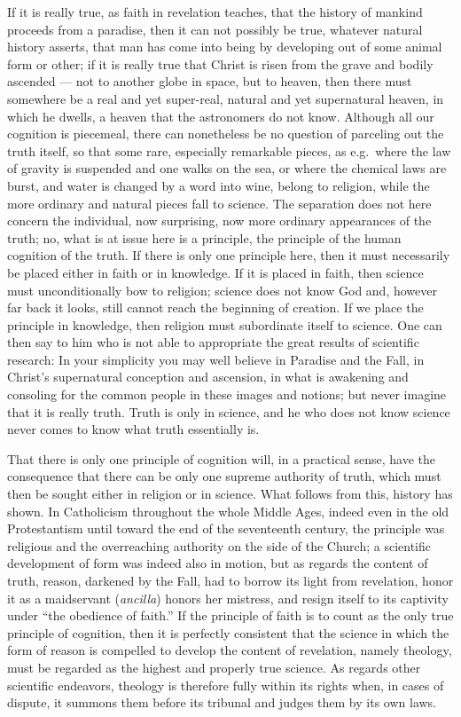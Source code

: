 \documentclass[12pt,a4paper]{article}
\newcommand{\opage}[1]{\marginnote{\footnotesize\textit{[#1]}}}
\begin{document}
If it is really true, as faith in revelation teaches, that
the history of mankind proceeds from a paradise, then it can
not possibly be true, whatever natural history asserts, that man
has come into being by developing out of some animal form or other;
if it is really true that Christ is risen from the grave and bodily
ascended --- not to another globe in space, but to
heaven, then there must somewhere be a real and yet super-real,
natural and yet supernatural heaven, in which he dwells, a
heaven that the astronomers do not know. Although all our cognition
is piecemeal, there can nonetheless be no question of parceling out
the truth itself, so that some rare, especially remarkable pieces,
as e.g.\ where the law of gravity is suspended and one walks
on the sea, or where the chemical laws are burst, and water is changed
by a word into wine, belong to religion, while the more ordinary
and natural pieces fall to science. The separation
does not here concern the individual, now surprising, now more
ordinary appearances of the truth; no, what is at issue here is a
principle, the principle of the human cognition of the truth.
If there is only one principle here, then it must necessarily be placed either in
faith or in knowledge. If it is placed in faith, then science must
unconditionally bow to religion; science does not know God
and, however far back it looks, still cannot reach the beginning of
creation. If we place the principle in knowledge, then religion
must subordinate itself to science. One can then say to
him who is not able to appropriate the great results of scientific
research: In your simplicity you may well believe
in Paradise and the Fall, in Christ's supernatural conception
and ascension, in what is awakening and consoling for the common
people in these images and notions; but never imagine that
it is really truth. Truth is only in science, and
he who does not know science never comes to know what
truth essentially is.

That there is only one principle of cognition will, in a practical sense,
\opage{13}have the consequence that there can be only one supreme authority
of truth, which must then be sought either in religion or in
science. What follows from this, history has shown. In Catholicism
throughout the whole Middle Ages, indeed even in the old Protestantism
until toward the end of the seventeenth century, the principle
was religious and the overreaching authority on the side of the Church; a
scientific development of form was indeed also in motion, but as
regards the content of truth, reason, darkened by the Fall,
had to borrow its light from revelation, honor it as a
maidservant (\textit{ancilla}) honors her mistress, and resign itself to its captivity
under ``the obedience of faith.'' If the principle of faith is to count as the
only true principle of cognition, then it is perfectly consistent
that the science in which the form of reason is compelled to
develop the content of revelation, namely theology, must be regarded
as the highest and properly true science. As regards other scientific
endeavors, theology is therefore fully within its rights
when, in cases of dispute, it summons them before its tribunal and
judges them by its own laws.
\end{document}
